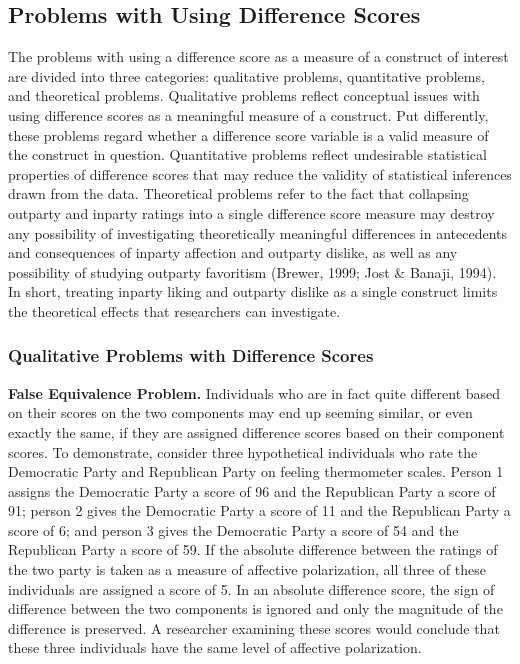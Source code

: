 \documentclass[authordate, meta]{jote-new-article}
\begin{document}
	\subsection{Problems with Using Difference Scores}



	The problems with using a difference score as a measure of a construct of interest are divided into three categories: qualitative problems, quantitative problems, and theoretical problems. Qualitative problems reflect conceptual issues with using difference scores as a meaningful measure of a construct. Put differently, these problems regard whether a difference score variable is a valid measure of the construct in question. Quantitative problems reflect undesirable statistical properties of difference scores that may reduce the validity of statistical inferences drawn from the data. Theoretical problems refer to the fact that collapsing outparty and inparty ratings into a single difference score measure may destroy any possibility of investigating theoretically meaningful differences in antecedents and consequences of inparty affection and outparty dislike, as well as any possibility of studying outparty favoritism (Brewer, 1999; Jost \& Banaji, 1994). In short, treating inparty liking and outparty dislike as a single construct limits the theoretical effects that researchers can investigate.



	\subsubsection{Qualitative Problems with Difference Scores}



	\textbf{False Equivalence Problem. }Individuals who are in fact quite different based on their scores on the two components may end up seeming similar, or even exactly the same, if they are assigned difference scores based on their component scores. To demonstrate, consider three hypothetical individuals who rate the Democratic Party and Republican Party on feeling thermometer scales. Person 1 assigns the Democratic Party a score of 96 and the Republican Party a score of 91; person 2 gives the Democratic Party a score of 11 and the Republican Party a score of 6; and person 3 gives the Democratic Party a score of 54 and the Republican Party a score of 59. If the absolute difference between the ratings of the two party is taken as a measure of affective polarization, all three of these individuals are assigned a score of 5. In an absolute difference score, the sign of difference between the two components is ignored and only the magnitude of the difference is preserved. A researcher examining these scores would conclude that these three individuals have the same level of affective polarization.
\end{document}
